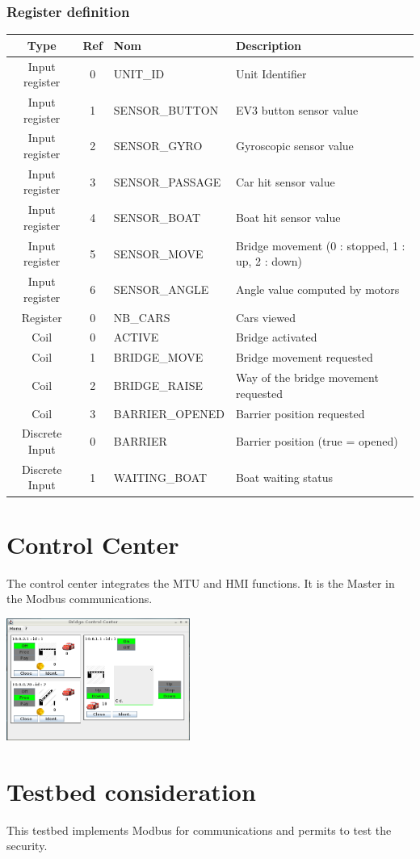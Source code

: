 \documentclass[10pt,a4paper]{article}
\begin{document}
	    \subsubsection{Register definition}
	
		\begin{tabular}{|c|c|l|l|}
		\hline 
		\textbf{Type} & \textbf{Ref} & \textbf{Nom} & \textbf{Description} \\ 
		\hline 
		Input register & 0 & UNIT\_ID & Unit Identifier\\ 
		\hline 
		Input register & 1 & SENSOR\_BUTTON & EV3 button sensor value\\ 
		\hline 
		Input register & 2 & SENSOR\_GYRO & Gyroscopic sensor value\\ 
		\hline 
		Input register & 3 & SENSOR\_PASSAGE & Car hit sensor value\\ 
		\hline 
		Input register & 4 & SENSOR\_BOAT & Boat hit sensor value\\ 
		\hline 
		Input register & 5 & SENSOR\_MOVE & Bridge movement (0 : stopped, 1 : up, 2 : down) \\ 
		\hline 
		Input register & 6 & SENSOR\_ANGLE & Angle value computed by motors\\ 
		\hline 
		Register & 0 & NB\_CARS & Cars viewed\\ 
		\hline 
		Coil & 0 & ACTIVE & Bridge activated\\ 
		\hline 
		Coil & 1 & BRIDGE\_MOVE & Bridge movement requested\\ 
		\hline 
		Coil & 2 & BRIDGE\_RAISE & Way of the bridge movement requested\\
		\hline 
		Coil & 3 & BARRIER\_OPENED & Barrier position requested\\ 
		\hline 
		Discrete Input & 0 & BARRIER & Barrier position (true = opened) \\ 
		\hline 
		Discrete Input & 1 & WAITING\_BOAT & Boat waiting status\\ 
		\hline 
		\end{tabular} 
		
\section{Control Center}
    The control center integrates the MTU and HMI functions. It is the Master in the Modbus communications.
    
	\begin{center}
	\includegraphics[height=4cm]{rsrc/CC_screenshot.png}
	\end{center}


\section{Testbed consideration}

    This testbed implements Modbus for communications and permits to test the security.
    
\end{document}
